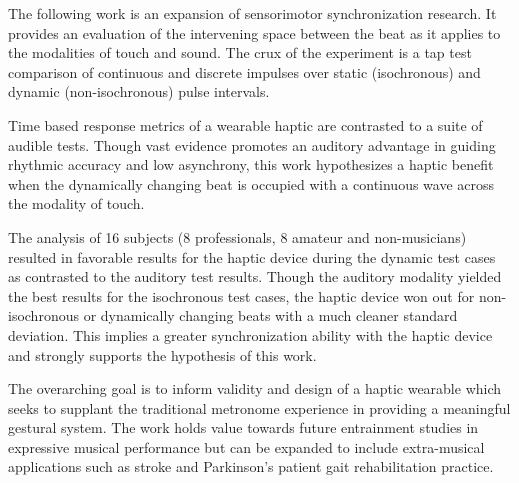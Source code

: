 
\setlength{\parskip}{1em}
\setlength{\parindent}{0em}

\noindent

The following work is an expansion of sensorimotor synchronization research. It provides an evaluation of the intervening space between the beat as it applies to the modalities of touch and sound. The crux of the experiment is a tap test comparison of continuous and discrete impulses over static (isochronous) and dynamic (non-isochronous) pulse intervals. 

Time based response metrics of a wearable haptic are contrasted to a suite of audible tests. Though vast evidence promotes an auditory advantage in guiding rhythmic accuracy and low asynchrony, this work hypothesizes a haptic benefit when the dynamically changing beat is occupied with a continuous wave across the modality of touch. 

The analysis of 16 subjects (8 professionals, 8 amateur and non-musicians) resulted in favorable results for the haptic device during the dynamic test cases as contrasted to the auditory test results. Though the auditory modality yielded the best results for the isochronous test cases, the haptic device won out for non-isochronous or dynamically changing beats with a much cleaner standard deviation. This implies a greater synchronization ability with the haptic device and strongly supports the hypothesis of this work.

The overarching goal is to inform validity and design of a haptic wearable which seeks to supplant the traditional metronome experience in providing a meaningful gestural system. The work holds value towards future entrainment studies in expressive musical performance but can be expanded to include extra-musical applications such as stroke and Parkinson's patient gait rehabilitation practice.